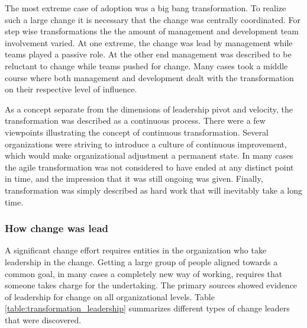 The most extreme case of adoption was a big bang transformation. To realize such
a large change it is necessary that the change was centrally coordinated.
For step wise transformations the the amount of management and development team
involvement varied. At one extreme, the change was lead by management while
teams played a passive role. At the other end management was described to be
reluctant to change while teams pushed for change. Many cases took a middle
course where both management and development dealt with the transformation on
their respective level of influence.

As a concept separate from the dimensions of leadership pivot and velocity, the
transformation was described as a continuous process. There were a few
viewpoints illustrating the concept of continuous transformation. Several
organizations were striving to introduce a culture of continuous improvement,
which would make organizational adjustment a permanent state. In many cases the
agile transformation was not considered to have ended at any distinct point in
time, and the impression that it was still ongoing was given. Finally,
transformation was simply described as hard work that will inevitably take a
long time.















\subsubsection{How change was lead}

A significant change effort requires entities in the organization who take
leadership in the change. Getting a large group of people aligned towards a
common goal, in many cases a completely new way of working, requires that
someone takes charge for the undertaking. The primary sources showed evidence of
leadership for change on all organizational levels. Table
\ref{table:transformation_leadership} summarizes different types of change
leaders that were discovered.

